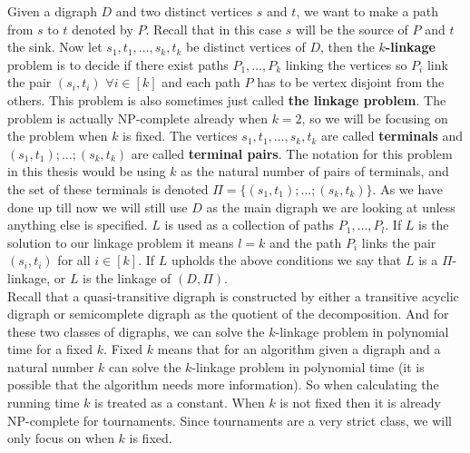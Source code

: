 Given a digraph $D$ and two distinct vertices $s$ and $t$, we want to make a path from $s$ to $t$ denoted by $P$. 
Recall that in this case $s$ will be the source of $P$ and $t$ the sink.
Now let $s_1,t_1,\dots ,s_k,t_k$ be distinct vertices of $D$, then the \textbf{$k$-linkage} problem is to decide if there exist paths $P_1,\dots ,P_k$ linking the vertices so $P_i$ link the pair $(s_i,t_i)$ $\forall i\in [k]$ and each path $P$ has to be vertex disjoint from the others. 
This problem is also sometimes just called \textbf{the linkage problem}.
The problem is actually NP-complete already when $k=2$, so we will be focusing on the problem when $k$ is fixed.
The vertices $s_1,t_1,\dots , s_k,t_k$ are called \textbf{terminals} and $(s_1,t_1);\dots ;(s_k,t_k)$ are called \textbf{terminal pairs}.
The notation for this problem in this thesis would be using $k$ as the natural number of pairs of terminals, and the set of these terminals is denoted $\Pi=\lbrace (s_1,t_1);\dots ;(s_k,t_k)\rbrace$. 
As we have done up till now we will still use $D$ as the main digraph we are looking at unless anything else is specified. 
$L$ is used as a collection of paths $P_1,\dots , P_l$. 
If $L$ is the solution to our linkage problem it means $l=k$ and the path $P_i$ links the pair $(s_i,t_i)$ for all $i\in [k]$.
If $L$ upholds the above conditions we say that $L$ is a $\Pi$-linkage, or $L$ is the linkage of $(D,\Pi)$.\\
Recall that a quasi-transitive digraph is constructed by either a transitive acyclic digraph or semicomplete digraph as the quotient of the decomposition. 
And for these two classes of digraphs, we can solve the $k$-linkage problem in polynomial time for a fixed $k$. 
Fixed $k$ means that for an algorithm given a digraph and a natural number $k$ can solve the $k$-linkage problem in polynomial time (it is possible that the algorithm needs more information). 
So when calculating the running time $k$ is treated as a constant.
When $k$ is not fixed then it is already NP-complete for tournaments.
Since tournaments are a very strict class, we will only focus on when $k$ is fixed.
